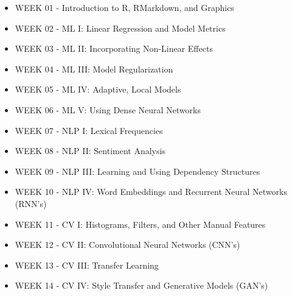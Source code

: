 \documentclass[12pt]{article}
\begin{document}
\begin{itemize}\setlength\itemsep{0em}
\item WEEK 01 - Introduction to R, RMarkdown, and Graphics \\
\item WEEK 02 - ML I: Linear Regression and Model Metrics
\item WEEK 03 - ML II: Incorporating Non-Linear Effects
\item WEEK 04 - ML III: Model Regularization
\item WEEK 05 - ML IV: Adaptive, Local Models
\item WEEK 06 - ML V: Using Dense Neural Networks \\
\item WEEK 07 - NLP I: Lexical Frequencies
\item WEEK 08 - NLP II: Sentiment Analysis
\item WEEK 09 - NLP III: Learning and Using Dependency Structures
\item WEEK 10 - NLP IV: Word Embeddings and Recurrent Neural Networks (RNN's) \\
\item WEEK 11 - CV I: Histograms, Filters, and Other Manual Features
\item WEEK 12 - CV II: Convolutional Neural Networks (CNN's)
\item WEEK 13 - CV III: Transfer Learning
\item WEEK 14 - CV IV: Style Transfer and Generative Models (GAN's)
\end{itemize}
\end{document}
